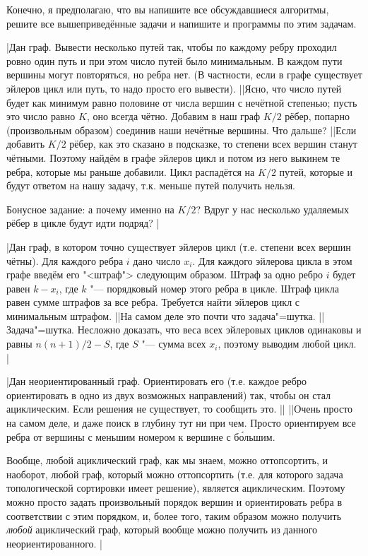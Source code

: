 
Конечно, я предполагаю, что вы напишите все обсуждавшиеся алгоритмы, решите все вышеприведённые задачи 
и напишите и программы по этим задачам.

\task|Дан граф. Вывести несколько путей так, чтобы по каждому ребру проходил ровно один путь и при этом число путей было 
минимальным. В каждом пути вершины могут повторяться, но ребра нет. (В частности, если в графе существует
эйлеров цикл или путь, то надо просто его вывести).
||Ясно, что число путей будет как минимум равно половине от числа вершин с нечётной степенью; пусть
это число равно $K$, оно всегда чётно. Добавим в наш граф $K/2$ рёбер, попарно (произвольным образом)
соединив наши нечётные вершины. Что дальше?
||Если добавить $K/2$ рёбер, как это сказано в подсказке, то степени всех вершин станут чётными.
Поэтому найдём в графе эйлеров цикл и потом из него выкинем те ребра, которые мы раньше добавили. Цикл распадётся
на $K/2$ путей, которые и будут ответом на нашу задачу, т.к. меньше путей получить нельзя.

Бонусное задание: а почему именно на $K/2$? Вдруг у нас несколько удаляемых рёбер в цикле будут идти подряд?
|\label{pathcover}

\task|Дан граф, в котором точно существует эйлеров цикл (т.е. степени всех вершин чётны). Для каждого ребра $i$
дано число $x_i$. Для каждого эйлерова цикла в этом графе введём его "<штраф"> следующим образом.
Штраф за одно ребро $i$ будет равен $k-x_i$, где $k$ "--- порядковый номер этого ребра в цикле. Штраф цикла
равен сумме штрафов за все ребра. Требуется найти эйлеров цикл с минимальным штрафом.
||На самом деле это почти что задача"=шутка.
||Задача"=шутка. Несложно доказать, что веса всех эйлеровых циклов одинаковы и равны $n(n+1)/2-S$,
где $S$ "--- сумма всех $x_i$, поэтому выводим любой цикл.
|\label{postman}

\task|Дан неориентированный граф. Ориентировать его (т.е. каждое ребро ориентировать в одно из двух возможных
направлений) так, чтобы он стал ациклическим. Если решения не существует, то сообщить это.
||
||Очень просто на самом деле, и даже поиск в глубину тут ни при чем. Просто
ориентируем все ребра от вершины с меньшим номером к вершине с б\'{о}льшим.

Вообще, любой ациклический граф, как мы знаем, можно оттопсортить, и наоборот, любой граф, который можно
оттопсортить (т.е. для которого задача топологической сортировки имеет решение), является ациклическим.
Поэтому можно просто задать произвольный порядок вершин и ориентировать ребра в соответствии с этим порядком,
и, более того, таким образом можно получить \textit{любой} ациклический граф, который вообще можно
получить из данного неориентированного.
|\label{nondirecttoacyclic}


